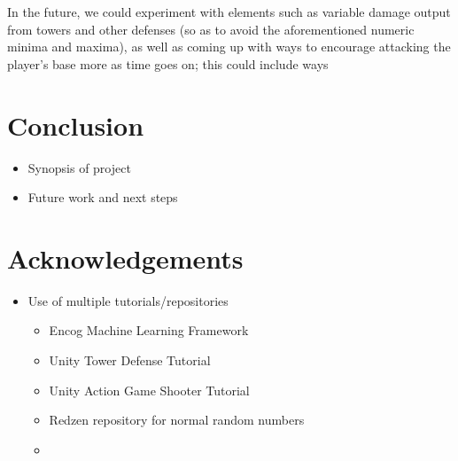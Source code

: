 \documentclass[letterpaper]{article}
\begin{document}
In the future, we could experiment with elements such as variable damage output
from towers and other defenses (so as to avoid the aforementioned numeric minima
and maxima), as well as coming up with ways to encourage attacking the player's
base more as time goes on; this could include ways

\section{Conclusion}
\begin{itemize}
    \item Synopsis of project
    \item Future work and next steps
\end{itemize}

\section{Acknowledgements}
\begin{itemize}
    \item Use of multiple tutorials/repositories
    \begin{itemize}
        \item Encog Machine Learning Framework
        \item Unity Tower Defense Tutorial
        \item Unity Action Game Shooter Tutorial
        \item Redzen repository for normal random numbers
        \item
    \end{itemize}
\end{itemize}

\footnotesize

\end{document}
